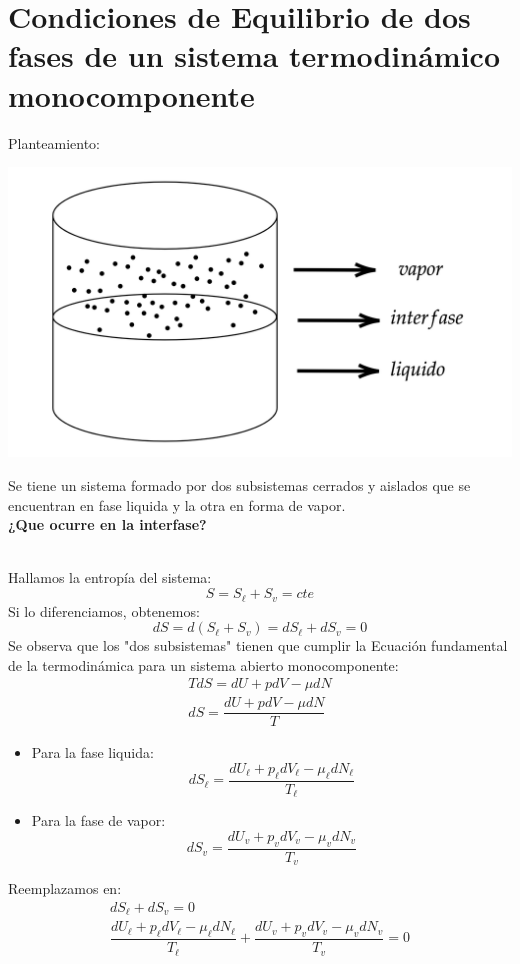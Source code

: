 \documentclass[../main]{subfiles}
\begin{document}
\chapter{Condiciones de Equilibrio de dos fases de un sistema termodinámico monocomponente}
\begin{minipage}{0.5\textwidth}
    Planteamiento:
    \begin{center}
        \includegraphics[scale=0.16]{Termodinámica/images/diagram-20221024.png}
    \end{center}
\end{minipage}
\begin{minipage}{0.5\textwidth}
    Se tiene un sistema formado por dos subsistemas cerrados y aislados que se encuentran en fase liquida y la otra en forma de vapor. \\[0.2cm]
    \textbf{¿Que ocurre en la interfase?}
\end{minipage}
\\[0.2cm]
Hallamos la entropía del sistema:
\begin{equation}
    S=S_{\ell}+S_v=cte
\end{equation}
Si lo diferenciamos, obtenemos:
\begin{equation}
    dS=d(S_{\ell}+S_v)=dS_{\ell}+dS_v=0
\end{equation}
Se observa que los "dos subsistemas" tienen que cumplir la Ecuación fundamental de la termodinámica para un sistema abierto monocomponente:
\begin{align}
    TdS=dU+pdV-\mu dN \\
    dS=\dfrac{dU+pdV-\mu dN}{T}
\end{align}
\begin{itemize}
    \item Para la fase liquida:
    \begin{equation}
        dS_{\ell}=\dfrac{dU_{\ell}+p_{\ell}dV_{\ell}-\mu_{\ell} dN_{\ell}}{T_{\ell}}
    \end{equation}
    \item Para la fase de vapor:
    \begin{equation}
        dS_{v}=\dfrac{dU_{v}+p_{v} dV_{v}-\mu_{v} dN_{v}}{T_{v}}
    \end{equation}
\end{itemize}
Reemplazamos en:
\begin{align}
    dS_{\ell}+dS_v=0 \\
    \dfrac{dU_{\ell}+p_{\ell}dV_{\ell}-\mu_{\ell} dN_{\ell}}{T_{\ell}}+\dfrac{dU_{v}+p_{v} dV_{v}-\mu_{v} dN_{v}}{T_{v}}=0
\end{align}
\end{document}
